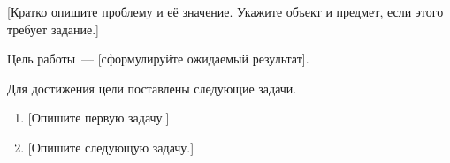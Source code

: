 
[Кратко опишите проблему и её значение. Укажите объект и предмет, если этого требует задание.]

Цель работы~--- [сформулируйте ожидаемый результат].

Для достижения цели поставлены следующие задачи.
\begin{enumerate}
    \item {}[Опишите первую задачу.]
    \item {}[Опишите следующую задачу.]
\end{enumerate}
